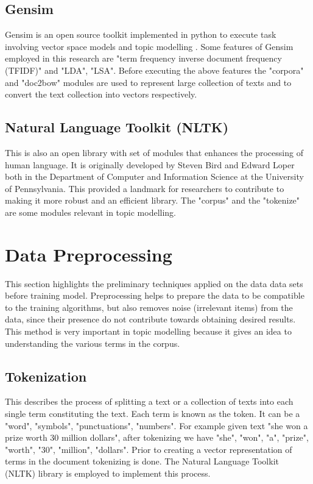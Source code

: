 \subsection{Gensim}
\begin{flushleft}
Gensim is an open source toolkit implemented in python to execute task involving vector space models and topic modelling \cite{rehurek2010software}. Some features of Gensim employed in this research are "term frequency inverse document frequency (TFIDF)" and "LDA", "LSA". Before executing the above features the "corpora" and "doc2bow" modules are used to represent large collection of texts and to convert the text collection into vectors respectively.
\end{flushleft}
\subsection{Natural  Language Toolkit (NLTK)}

This is also an open library with set of modules that enhances the processing of human language. It is originally developed by Steven Bird and Edward Loper both in  the Department of Computer and Information Science at the University of Pennsylvania. This provided a landmark for researchers to contribute to making it more robust and an efficient library. The "corpus" and the "tokenize" are some modules relevant in topic modelling.
\section{Data Preprocessing}
\begin{flushleft}
This section highlights the preliminary techniques applied on the data data sets before training model. Preprocessing helps to prepare the data to be compatible to the training algorithms, but also removes noise (irrelevant items) from the data, since their presence do not contribute towards obtaining desired results. This method is very important in topic modelling because it gives an idea to understanding the various terms in the corpus.
\end{flushleft}
\subsection{Tokenization}
\begin{flushleft}
This describes the process of splitting  a text or a collection of texts  into each single term constituting the text. Each term is known as the token. It can be a "word", "symbols", "punctuations", "numbers". For example given text "she won a prize worth 30 million dollars", after tokenizing we have "she", "won", "a", "prize", "worth", "30", "million", "dollars". Prior to creating a vector representation of terms in the document tokenizing is done. The Natural Language Toolkit (NLTK) library is employed to implement this process.
\end{flushleft}
